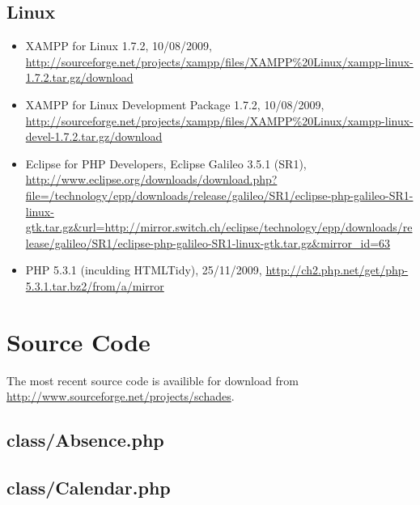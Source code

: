 \documentclass[12pt,a4paper,twoside,openany]{report}
\begin{document}
\section{Linux}
\begin{itemize}

\item XAMPP for Linux 1.7.2, 10/08/2009,
\url{http://sourceforge.net/projects/xampp/files/XAMPP%20Linux/xampp-linux-1.7.2.tar.gz/download}

\item XAMPP for Linux Development Package 1.7.2, 10/08/2009,
\url{http://sourceforge.net/projects/xampp/files/XAMPP%20Linux/xampp-linux-devel-1.7.2.tar.gz/download}

\item Eclipse for PHP Developers, Eclipse Galileo 3.5.1 (SR1),
\url{http://www.eclipse.org/downloads/download.php?file=/technology/epp/downloads/release/galileo/SR1/eclipse-php-galileo-SR1-linux-gtk.tar.gz&url=http://mirror.switch.ch/eclipse/technology/epp/downloads/release/galileo/SR1/eclipse-php-galileo-SR1-linux-gtk.tar.gz&mirror_id=63}

\item PHP 5.3.1 (inculding HTMLTidy), 25/11/2009,
\url{http://ch2.php.net/get/php-5.3.1.tar.bz2/from/a/mirror}

\end{itemize}

\renewcommand{\bibname}{\chapter{Sources}\section{Primary Sources}}



\chapter{Source Code}
The most recent source code is availible for download from
\url{http://www.sourceforge.net/projects/schades}.

\lstlistoflistings
\newpage\section{class/Absence.php}


\newpage\section{class/Calendar.php}

\end{document}
